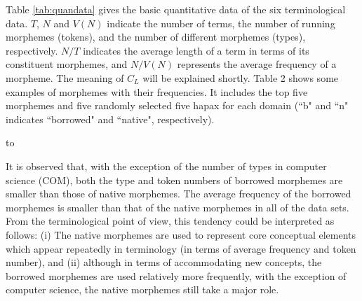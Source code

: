Table \ref{tab:quandata} gives the basic quantitative data of the
six terminological data. $T$, $N$ and $V(N)$ indicate the number
of terms, the number of running morphemes (tokens), and the number of
different morphemes (types), respectively. $N/T$ indicates the average
length of a term in terms of its constituent morphemes, and $N/V(N)$
represents the average frequency of a morpheme. The meaning of $C_L$
will be explained shortly. Table 2 shows some examples of morphemes with
their frequencies. It includes the top five morphemes and five randomly 
selected five hapax for each domain (``b" and ``n" indicates ``borrowed" and ``native", 
respectively).

\begin{table*}[tb]
\caption{Some examples of morphemes}
\label{tab:bakabon}
\hbox to
\end{table*}

It is observed that, with the exception of the number of types in computer
science (COM), both the type and token numbers of borrowed morphemes are smaller
than those of native morphemes. The average frequency of the borrowed morphemes
is smaller than that of the native morphemes in all of the data sets. 
From the terminological point of view, this tendency
could be interpreted as follows: (i) The native morphemes are used to represent
core conceptual elements which appear repeatedly in terminology (in terms of average
frequency and token number), and (ii) although in terms of accommodating
new concepts, the borrowed morphemes are used relatively more frequently,
with the exception of computer science, the native morphemes still take a
major role.

